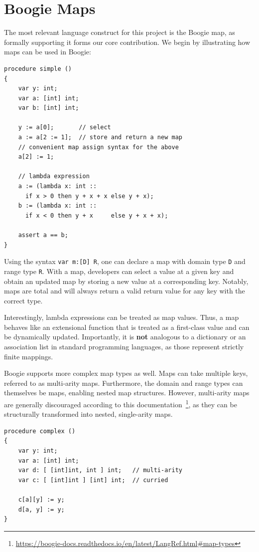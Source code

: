 \section{Boogie Maps}
\label{sec:semantics-boogie-maps}

The most relevant language construct for this project is the Boogie map,
as formally supporting it forms our core contribution.
We begin by illustrating how maps can be used in Boogie:

\begin{lstlisting}[caption={Simple Boogie Map Example}]
procedure simple ()
{
    var y: int;
    var a: [int] int;
    var b: [int] int;
    
    y := a[0];       // select
    a := a[2 := 1];  // store and return a new map
    // convenient map assign syntax for the above
    a[2] := 1;  

    // lambda expression
    a := (lambda x: int :: 
      if x > 0 then y + x + x else y + x);
    b := (lambda x: int ::
      if x < 0 then y + x     else y + x + x);
  
    assert a == b;
}
\end{lstlisting}

Using the syntax \lstinline[columns=fixed]{var m:[D] R}, one can declare a map with domain type \lstinline[columns=fixed]{D} and range type \lstinline[columns=fixed]{R}.
With a map, developers can select a value at a given key and obtain an updated map by storing a new value at a corresponding key.
Notably, maps are total and will always return a valid return value for any key with the correct type.

Interestingly, lambda expressions can be treated as map values.
Thus, a map behaves like an extensional function that is treated as a first-class value and can be dynamically updated.
Importantly, it is \textbf{not} analogous to a dictionary or an association list in standard programming languages, as those represent strictly finite mappings.

Boogie supports more complex map types as well.
Maps can take multiple keys, referred to as multi-arity maps.
Furthermore, the domain and range types can themselves be maps, enabling nested map structures.
However, multi-arity maps are generally discouraged according to this documentation~\footnote{\url{https://boogie-docs.readthedocs.io/en/latest/LangRef.html\#map-types}},
as they can be structurally transformed into nested, single-arity maps.

\begin{lstlisting}[caption={Multi-Arity Boogie Map Example}]
procedure complex ()
{
    var y: int;
    var a: [int] int;
    var d: [ [int]int, int ] int;   // multi-arity
    var c: [ [int]int ] [int] int;  // curried
    
    c[a][y] := y;
    d[a, y] := y;
}
\end{lstlisting}

